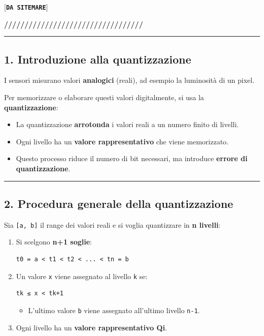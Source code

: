 \documentclass[
]{article}
\providecommand{\tightlist}{%
  \setlength{\itemsep}{0pt}\setlength{\parskip}{0pt}}
\begin{document}
{[}\textbf{\texttt{DA\ SITEMARE}}{]}

\textbf{//////////////////////////////////}

\begin{center}\rule{0.5\linewidth}{0.5pt}\end{center}

\hypertarget{introduzione-alla-quantizzazione}{%
\subsection{1. Introduzione alla quantizzazione}\label{introduzione-alla-quantizzazione}}

I sensori misurano valori \textbf{analogici} (reali), ad esempio la luminosità di un pixel.

Per memorizzare o elaborare questi valori digitalmente, si usa la \textbf{quantizzazione}:

\begin{itemize}
\tightlist
\item
  La quantizzazione \textbf{arrotonda} i valori reali a un numero finito di livelli.
\item
  Ogni livello ha un \textbf{valore rappresentativo} che viene memorizzato.
\item
  Questo processo riduce il numero di bit necessari, ma introduce \textbf{errore di quantizzazione}.
\end{itemize}

\begin{center}\rule{0.5\linewidth}{0.5pt}\end{center}

\hypertarget{procedura-generale-della-quantizzazione}{%
\subsection{2. Procedura generale della quantizzazione}\label{procedura-generale-della-quantizzazione}}

Sia \texttt{{[}a,\ b{]}} il range dei valori reali e si voglia quantizzare in \textbf{n livelli}:

\begin{enumerate}
\def\labelenumi{\arabic{enumi}.}
\item
  Si scelgono \textbf{n+1 soglie}:

\begin{verbatim}
t0 = a < t1 < t2 < ... < tn = b
\end{verbatim}
\item
  Un valore \texttt{x} viene assegnato al livello \texttt{k} se:

\begin{verbatim}
tk ≤ x < tk+1
\end{verbatim}

  \begin{itemize}
  \tightlist
  \item
    L'ultimo valore \texttt{b} viene assegnato all'ultimo livello \texttt{n-1}.
  \end{itemize}
\item
  Ogni livello ha un \textbf{valore rappresentativo Qi}.
\end{enumerate}
\end{document}
